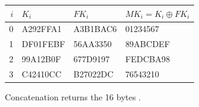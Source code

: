 \begin{center}\begin{tabular}{rlll}\toprule
$i$ & $K_i$ & $FK_i$ & $MK_i=K_i\oplus FK_i$\\\midrule
0 & A292FFA1 & A3B1BAC6 & 01234567\\
1 & DF01FEBF & 56AA3350 & 89ABCDEF\\
2 & 99A12B0F & 677D9197 & FEDCBA98\\
3 & C42410CC & B27022DC & 76543210\\
\bottomrule\end{tabular}\end{center}
Concatenation returns the 16 bytes .
